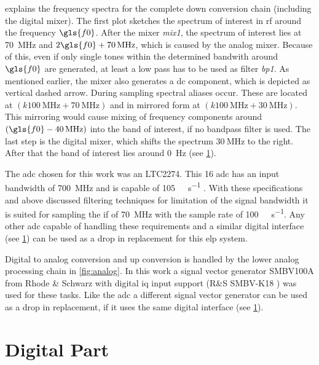 \documentclass[12pt,a4paper,parskip=full,abstract=true,BCOR=12mm,twoside,open=right]{scrreprt}
\def\device#1{\mbox{\textit{#1}}}
\begin{document}
 explains the frequency spectra for the complete down
conversion chain (including the digital mixer). The first plot sketches the
spectrum of interest in \gls{rf} around the frequency $\gls{f0}$. After the mixer \device{mix1}, the
spectrum of interest lies at \SI{70}{\mega\hertz} and $2\gls{f0} + \SI{70}{\mega\hertz}$,
which is caused by the analog mixer. Because of this, even if only single tones
within the determined bandwith around $\gls{f0}$ are generated, at least a low pass
has to be used as filter \device{bp1}. As mentioned earlier, the mixer also generates a \gls{dc} component, which is depicted as vertical dashed arrow. During sampling spectral aliases occur. These
are located at $(k \SI{100}{\mega\hertz} + \SI{70}{\mega\hertz})$ and in mirrored form at
$(k \SI{100}{\mega\hertz} + \SI{30}{\mega\hertz})$. This mirroring would cause mixing
of frequency components around $(\gls{f0} - \SI{40}{\mega\hertz})$ into the band of interest,
if no bandpass filter is used. The last step is the digital mixer, which shifts
the spectrum $\SI{30}{\mega\hertz}$ to the right. After that the band of interest lies around
\SI{0}{\hertz} (see \cref{sec:digital}).

The \gls{adc} chosen for this work was an LTC2274. This \SI{16}{\bit} \gls{adc}
has an input bandwidth of \SI{700}{\mega\hertz} and is capable of
\SI{105}{\mega\samples\per\second} \cite{ltc2274}. With these specifications and above discussed filtering techniques for limitation of the signal bandwidth it
is suited for sampling the \gls{if} of \SI{70}{\mega\hertz} with the sample rate
of \SI{100}{\mega\samples\per\second}. Any other \gls{adc} capable of handling
these requirements and a similar digital interface (see \cref{sec:digital}) can be used as a drop in
replacement for this \gls{elp} system.

Digital to analog conversion and up conversion is handled by the lower analog
processing chain in \cref{fig:analog}. In this work a signal vector generator
SMBV100A from Rhode \& Schwarz with digital \gls{iq} input support (R\&S SMBV-K18
\cite{smbv_100a}) was used for these tasks. Like the \gls{adc} a different
signal vector generator can be used as a drop in replacement, if it uses
the same digital interface (see \cref{sec:digital}).


\section{Digital Part}
\label{sec:digital}
\end{document}

